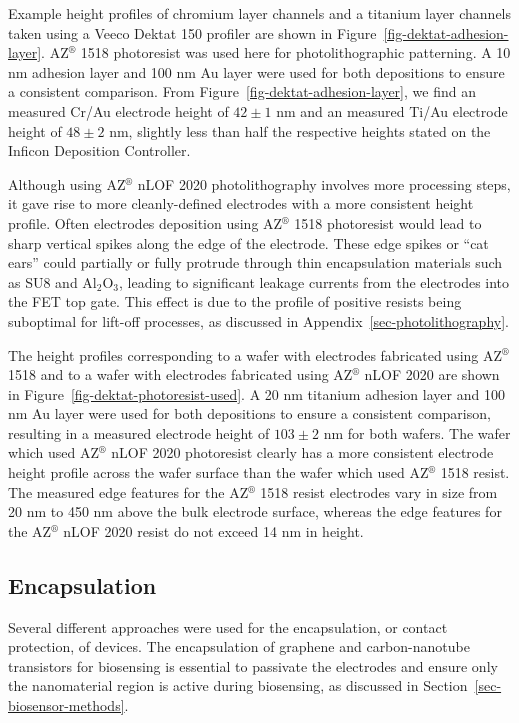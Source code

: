 \documentclass[
  a4paper,
]{scrbook}
\begin{document}
Example height profiles of chromium layer channels and a titanium layer
channels taken using a Veeco Dektat 150 profiler are shown in
Figure~\ref{fig-dektat-adhesion-layer}. AZ\(^\circledR\) 1518
photoresist was used here for photolithographic patterning. A 10 nm
adhesion layer and 100 nm Au layer were used for both depositions to
ensure a consistent comparison. From
Figure~\ref{fig-dektat-adhesion-layer}, we find an measured Cr/Au
electrode height of \(42\pm1\) nm and an measured Ti/Au electrode height
of \(48\pm2\) nm, slightly less than half the respective heights stated
on the Inficon Deposition Controller.

Although using AZ\(^\circledR\) nLOF 2020 photolithography involves more
processing steps, it gave rise to more cleanly-defined electrodes with a
more consistent height profile. Often electrodes deposition using
AZ\(^\circledR\) 1518 photoresist would lead to sharp vertical spikes
along the edge of the electrode. These edge spikes or ``cat ears'' could
partially or fully protrude through thin encapsulation materials such as
SU8 and Al\(_2\)O\(_3\), leading to significant leakage currents from
the electrodes into the FET top gate. This effect is due to the profile
of positive resists being suboptimal for lift-off processes, as
discussed in Appendix~\ref{sec-photolithography}.

The height profiles corresponding to a wafer with electrodes fabricated
using AZ\(^\circledR\) 1518 and to a wafer with electrodes fabricated
using AZ\(^\circledR\) nLOF 2020 are shown in
Figure~\ref{fig-dektat-photoresist-used}. A 20 nm titanium adhesion
layer and 100 nm Au layer were used for both depositions to ensure a
consistent comparison, resulting in a measured electrode height of
\(103\pm2\) nm for both wafers. The wafer which used AZ\(^\circledR\)
nLOF 2020 photoresist clearly has a more consistent electrode height
profile across the wafer surface than the wafer which used
AZ\(^\circledR\) 1518 resist. The measured edge features for the
AZ\(^\circledR\) 1518 resist electrodes vary in size from 20 nm to 450
nm above the bulk electrode surface, whereas the edge features for the
AZ\(^\circledR\) nLOF 2020 resist do not exceed 14 nm in height.

\hypertarget{encapsulation}{%
\subsection{Encapsulation}\label{encapsulation}}

Several different approaches were used for the encapsulation, or contact
protection, of devices. The encapsulation of graphene and
carbon-nanotube transistors for biosensing is essential to passivate the
electrodes and ensure only the nanomaterial region is active during
biosensing, as discussed in Section~\ref{sec-biosensor-methods}.
\end{document}

